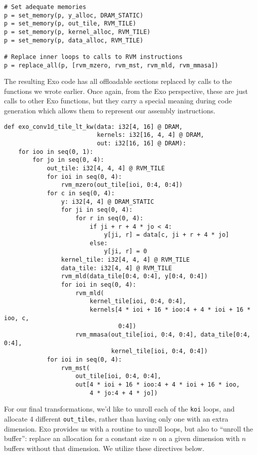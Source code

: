 \documentclass[acmsmall, nonacm=true]{acmart}
\begin{document}
\begin{verbatim}
# Set adequate memories
p = set_memory(p, y_alloc, DRAM_STATIC)
p = set_memory(p, out_tile, RVM_TILE)
p = set_memory(p, kernel_alloc, RVM_TILE)
p = set_memory(p, data_alloc, RVM_TILE)

# Replace inner loops to calls to RVM instructions
p = replace_all(p, [rvm_mzero, rvm_mst, rvm_mld, rvm_mmasa])
\end{verbatim}
The resulting Exo code has all offloadable sections replaced by calls to the functions we wrote earlier. Once again, from the Exo perspective, these are just calls to other Exo functions, but they carry a special meaning during code generation which allows them to represent our assembly instructions. 

\begin{verbatim}
def exo_conv1d_tile_lt_kw(data: i32[4, 16] @ DRAM,
                          kernels: i32[16, 4, 4] @ DRAM,
                          out: i32[16, 16] @ DRAM):
    for ioo in seq(0, 1):
        for jo in seq(0, 4):
            out_tile: i32[4, 4, 4] @ RVM_TILE
            for ioi in seq(0, 4):
                rvm_mzero(out_tile[ioi, 0:4, 0:4])
            for c in seq(0, 4):
                y: i32[4, 4] @ DRAM_STATIC
                for ji in seq(0, 4):
                    for r in seq(0, 4):
                        if ji + r + 4 * jo < 4:
                            y[ji, r] = data[c, ji + r + 4 * jo]
                        else:
                            y[ji, r] = 0
                kernel_tile: i32[4, 4, 4] @ RVM_TILE
                data_tile: i32[4, 4] @ RVM_TILE
                rvm_mld(data_tile[0:4, 0:4], y[0:4, 0:4])
                for ioi in seq(0, 4):
                    rvm_mld(
                        kernel_tile[ioi, 0:4, 0:4],
                        kernels[4 * ioi + 16 * ioo:4 + 4 * ioi + 16 * ioo, c,
                                0:4])
                    rvm_mmasa(out_tile[ioi, 0:4, 0:4], data_tile[0:4, 0:4],
                              kernel_tile[ioi, 0:4, 0:4])
            for ioi in seq(0, 4):
                rvm_mst(
                    out_tile[ioi, 0:4, 0:4],
                    out[4 * ioi + 16 * ioo:4 + 4 * ioi + 16 * ioo,
                        4 * jo:4 + 4 * jo])
\end{verbatim}

For our final transformations, we'd like to unroll each of the \verb|koi| loops, and allocate 4 different \verb|out_tile|s, rather than having only one with an extra dimension. Exo provides us with a routine to unroll loops, but also to ``unroll the buffer'': replace an allocation for a constant size $n$ on a given dimension with $n$ buffers without that dimension. We utilize these directives below.
\end{document}
